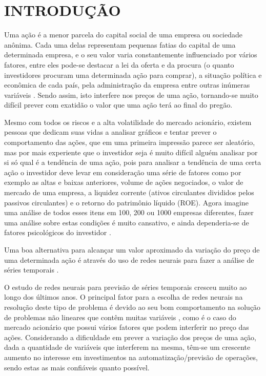 \chapter{INTRODUÇÃO} 

	Uma ação é a menor parcela do capital social de uma empresa ou sociedade anônima. Cada uma delas representam pequenas fatias do capital de uma determinada empresa, e o seu valor varia constantemente influenciado por vários fatores, entre eles pode-se destacar a lei da oferta e da procura (o quanto investidores procuram uma determinada ação para comprar), a situação política e econômica de cada país, pela administração da empresa entre outras inúmeras variáveis \cite{REPORTERBRASIL}. Sendo assim, isto interfere nos preços de uma ação, tornando-se muito difícil prever com exatidão o valor que uma ação terá ao final do pregão.
	
	Mesmo com todos os riscos e a alta volatilidade do mercado acionário, existem pessoas que dedicam suas vidas a analisar gráficos e tentar prever o comportamento das ações, que em uma primeira impressão parece ser aleatório, mas por mais experiente que o investidor seja é muito difícil alguém analisar por si só qual é a tendência de uma ação, pois para analisar a tendência de uma certa ação o investidor deve levar em consideração uma série de fatores como por exemplo as altas e baixas anteriores, volume de ações negociados, o valor de mercado de uma empresa, a liquidez corrente (ativos circulantes divididos pelos passivos circulantes) e o retorno do patrimônio líquido (ROE). Agora imagine uma análise de todos esses itens em 100, 200 ou 1000 empresas diferentes, fazer uma análise sobre estas condições é muito cansativo, e ainda dependeria-se de fatores psicológicos do investidor \cite{FOGACA}.   
	
	Uma boa alternativa para alcançar um valor aproximado da variação do preço de uma determinada ação é através do uso de redes neurais para fazer a análise de séries temporais \cite{GIACOMELL}.  
	
	O estudo de redes neurais para previsão de séries temporais cresceu muito ao longo dos últimos anos. O principal fator para a escolha de redes neurais na resolução deste tipo de problema é devido ao seu bom comportamento na solução de problemas não lineares que contêm muitas variáveis \cite{GIACOMELL}, como é o caso do mercado acionário que possui vários fatores que podem interferir no preço das ações. Considerando  a dificuldade em prever a variação dos preços de uma ação, dada a quantidade de variáveis que interferem na mesma, têm-se um crescente aumento no interesse em investimentos na automatização/previsão de operações, sendo estas as mais confiáveis quanto possível.    
	
